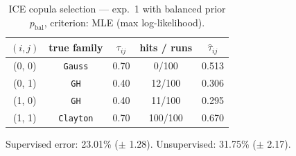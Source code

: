 \begin{table}[htbp]
  \centering
  \caption{ICE copula selection — exp.\ 1 with balanced prior $p_{\text{bal}}$, criterion: MLE (max log-likelihood).}
  \label{tab:exp3-exp1_bal_p__mle}
  \begin{tabular}{ccccc}
    \toprule
    $(i, j)$ & true family & $\tau_{ij}$ & hits / runs & $\hat\tau_{ij}$ \\
    \midrule
    (0, 0) & \texttt{Gauss} & 0.70 & 0/100 & 0.513 \\
    (0, 1) & \texttt{GH} & 0.40 & 12/100 & 0.306 \\
    (1, 0) & \texttt{GH} & 0.40 & 11/100 & 0.295 \\
    (1, 1) & \texttt{Clayton} & 0.70 & 100/100 & 0.670 \\
    \bottomrule
  \end{tabular}
  \par\smallskip Supervised error: 23.01\% ($\pm$ 1.28). Unsupervised: 31.75\% ($\pm$ 2.17).
\end{table}
